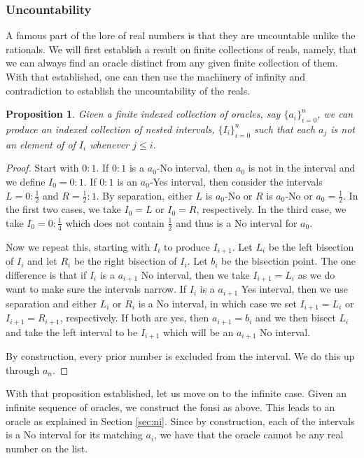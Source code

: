 \documentclass[12pt]{article}
\newtheorem{proposition}{Proposition}[subsection]
\theoremstyle{remark}
\begin{document}
\subsubsection{Uncountability}

A famous part of the lore of real numbers is that they are uncountable unlike the rationals. We will first establish a result on finite collections of reals, namely, that we can always find an oracle distinct from any given finite collection of them. With that established, one can then use the machinery of infinity and contradiction to establish the uncountability of the reals. 

\begin{proposition}\label{pr:notlist}
Given a finite indexed collection of oracles, say $\{a_i\}_{i=0}^n$, we can produce an indexed collection of nested intervals, $\{I_i\}_{i=0}^n$ such that each $a_j$ is not an element of of $I_i$ whenever $j \leq i$.
\end{proposition}

\begin{proof}
Start with $0:1$. If $0:1$ is a $a_0$-No interval, then $a_0$ is not in the interval and we define $I_0 = 0:1$. If $0:1$ is an $a_0$-Yes interval, then consider the intervals $L= 0:\tfrac{1}{2}$ and $R = \tfrac{1}{2}:1$. By separation, either $L$ is $a_0$-No or $R$ is $a_0$-No or $a_0 = \tfrac{1}{2}$. In the first two cases, we take $I_0=L$ or $I_0=R$, respectively. In the third case, we take $I_0 = 0:\tfrac{1}{4}$ which does not contain $\tfrac{1}{2}$ and thus is a No interval for $a_0$.

Now we repeat this, starting with $I_i$ to produce $I_{i+1}$. Let $L_i$ be the left bisection of $I_i$ and let $R_i$ be the right bisection of $I_i$. Let $b_i$ be the bisection point. The one difference is that if $I_i$ is a $a_{i+1}$ No interval, then we take $I_{i+1} = L_i$ as we do want to make sure the intervals narrow. If $I_i$ is a $a_{i+1}$ Yes interval, then we use separation and either $L_i$ or $R_i$ is a No interval, in which case we set $I_{i+1} = L_i $ or $I_{i+1} = R_{i+1}$, respectively. If both are yes, then $a_{i+1} = b_i$ and we then bisect $L_i$ and take the left interval to be $I_{i+1}$ which will be an $a_{i+1}$ No interval. 

By construction, every prior number is excluded from the interval. We do this up through $a_n$.
\end{proof} 

With that proposition established, let us move on to the infinite case. Given an infinite sequence of oracles, we construct the fonsi as above. This leads to an oracle as explained in Section \ref{sec:ni}. Since by construction, each of the intervals is a No interval for its matching $a_i$, we have that the oracle cannot be any real number on the list. 
\end{document}
